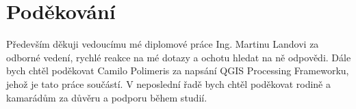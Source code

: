 \vfill

\vglue 14cm

\section*{Poděkování}
\indent\indent Především děkuji vedoucímu mé diplomové práce Ing. Martinu Landovi za odborné vedení, rychlé reakce na mé dotazy a ochotu hledat na ně odpovědi. Dále bych chtěl poděkovat Camilo Polimeris za napsání QGIS Processing Frameworku, jehož je tato práce součástí. V neposlední řadě bych chtěl poděkovat rodině a kamarádům za důvěru a podporu během studií.
